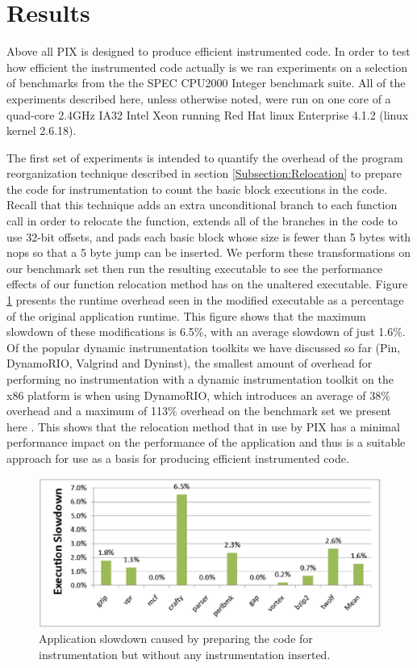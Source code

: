 \section{Results}

Above all PIX is designed to produce efficient instrumented code. In order to test how efficient the
instrumented code actually is we ran experiments on a selection of benchmarks from the the SPEC CPU2000
Integer benchmark suite. All of the experiments described here, unless otherwise noted, were run on
one core of a quad-core 2.4GHz IA32 Intel Xeon running Red Hat linux Enterprise 4.1.2 (linux kernel 2.6.18).

The first set of experiments is intended to quantify the overhead of the program reorganization technique 
described in section \ref{Subsection:Relocation} to prepare the code for instrumentation to count
the basic block executions in the code. Recall that this technique adds an extra unconditional
branch to each function call in order to relocate the function, extends all of the branches in the code
to use 32-bit offsets, and pads each basic block whose size is fewer than 5 bytes with nops so that a
5 byte jump can be inserted. We perform these transformations on our benchmark set then run the resulting executable
to see the performance effects of our function relocation method has on the unaltered executable. Figure \ref{Figure:RelocOverhead} presents
the runtime overhead seen in the modified executable as a percentage of the original application runtime.
This figure shows that the maximum slowdown of these modifications is 6.5\%, with an
average slowdown of just 1.6\%. Of the popular dynamic instrumentation toolkits we have discussed so far (Pin, 
DynamoRIO, Valgrind and Dyninst), the smallest amount of overhead for performing no instrumentation with a dynamic instrumentation toolkit
on the x86 platform is when using DynamoRIO, which introduces an average of 38\% overhead and a maximum of 113\% overhead on the benchmark
set we present here \cite{luk2005pin}. This shows that the relocation method that in use by PIX has a minimal
performance impact on the performance of the application and thus is a suitable approach for use as a basis for
producing efficient instrumented code.

\begin{figure}[ht]
\centering
\label{Figure:RelocOverhead}
\includegraphics[scale=0.6]{relocperf.eps}
\caption{Application slowdown caused by preparing the code for instrumentation but without
any instrumentation inserted.}
\end{figure}

